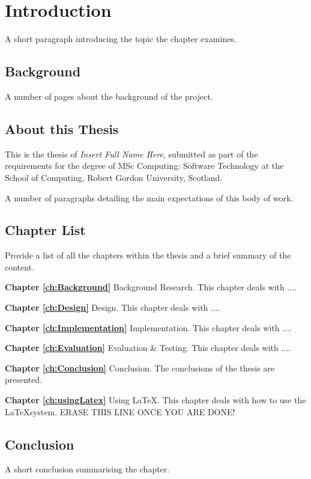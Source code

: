 \chapter{Introduction}
 \setcounter{page}{1}

A short paragraph introducing the topic the chapter examines.


\section{Background}

A number of pages about the background of the project.

\section{About this Thesis}
This is the thesis of \emph{Insert Full Name Here}, submitted as part of the requirements for the degree of MSc Computing: Software Technology at the School of Computing, Robert Gordon University, Scotland.

A number of paragraphs detailing the main expectations of this body of work.


\section{Chapter List}
Provide a list of all the chapters within the thesis and a brief summary of the content.

\textbf{Chapter \ref{ch:Background}} Background Research. This chapter
deals with $\ldots$.

\textbf{Chapter \ref{ch:Design}} Design. This chapter
deals with $\ldots$.

\textbf{Chapter \ref{ch:Implementation}} Implementation. This chapter
deals with $\ldots$.

\textbf{Chapter \ref{ch:Evaluation}} Evaluation \& Testing. This chapter
deals with $\ldots$.

\textbf{Chapter \ref{ch:Conclusion}} Conclusion. The conclusions of the thesis are presented.

\textbf{Chapter \ref{ch:usingLatex}} Using \LaTeX. This chapter
deals with how to use the \LaTeX \space system. ERASE THIS LINE ONCE YOU ARE DONE!


\section{Conclusion}
A short conclusion summarising the chapter.

